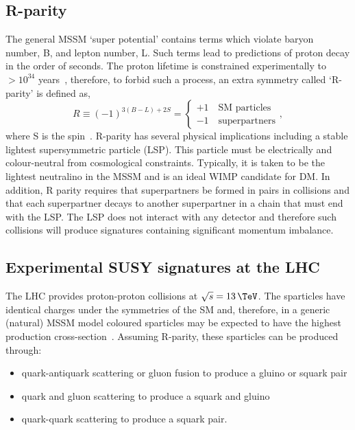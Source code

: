 \subsection{R-parity}

The general MSSM `super potential' contains terms which violate baryon number, B, and lepton number, 
L. Such terms lead to predictions of proton decay in the order of seconds. 
The proton lifetime is constrained experimentally to $> 10^{34}$ years~\cite{protonDecay},
therefore, to forbid such a process, an extra symmetry called `R-parity' is defined as,
\begin{equation}
R \equiv (-1)^{3(B-L)+2S} = 
\begin{cases}
+ 1\quad \text{SM particles}\\
- 1\quad \text{superpartners}
\end{cases},
\end{equation}
where S is the spin~\cite{SUSYP}. R-parity has several physical implications including a stable lightest supersymmetric 
particle (LSP). This particle must be electrically and colour-neutral from cosmological constraints.
Typically, it is taken to be the lightest neutralino in the MSSM and is an ideal WIMP candidate for DM. 
In addition, R parity requires that superpartners be
formed in pairs in collisions and that each superpartner decays to another superpartner
in a chain that must end with the LSP. The LSP does not interact with any detector and therefore
such collisions will produce signatures containing significant momentum imbalance.

\subsection{Experimental SUSY signatures at the LHC}

The LHC provides proton-proton collisions at $\sqrt{s} = 13\,\TeV$. The sparticles have identical charges under 
the symmetries of the SM and, therefore, in a generic (natural) MSSM model 
coloured sparticles may be expected to have the highest production 
cross-section~\cite{susyprod}. Assuming R-parity, these sparticles can be produced through:

\begin{itemize}
\item quark-antiquark scattering or gluon fusion to produce a gluino or squark pair
\item quark and gluon scattering to produce a squark and gluino
\item quark-quark scattering to produce a squark pair.
\end{itemize}

